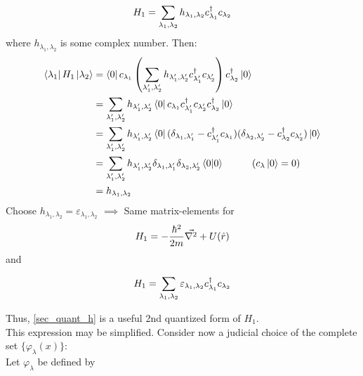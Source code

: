 \begin{equation}
	H_1 = \sum_{\lambda_1, \lambda_2} h_{\lambda_1, \lambda_2} c^{\dagger}_{\lambda_1} c_{\lambda_2}
\end{equation}
where $ h_{\lambda_1, \lambda_2}$ is some complex number.
Then:
\begin{align}
	\bra{\lambda_1} H_1 \ket{\lambda_2} &= \bra{0}c_{\lambda_1} \left(\sum_{\lambda'_1, \lambda'_2} h_{\lambda'_1, \lambda'_2} c^{\dagger}_{\lambda'_1} c_{\lambda'_2} \right) c^{\dagger}_{\lambda_2} \ket{0} \\
	&=\sum_{\lambda'_1, \lambda'_2} h_{\lambda'_1, \lambda'_2}  \bra{0}c_{\lambda_1}  c^{\dagger}_{\lambda'_1} c_{\lambda'_2} c^{\dagger}_{\lambda_2} \ket{0} \nonumber \\
	&= \sum_{\lambda'_1, \lambda'_2} h_{\lambda'_1, \lambda'_2}  \bra{0} (\delta_{\lambda_1, \lambda'_1}-c^{\dagger}_{\lambda'_1}c_{\lambda_1} ) (\delta_{\lambda_2, \lambda'_2} -c^{\dagger}_{\lambda_2} c_{\lambda'_2}) \ket{0} \nonumber\\
	&= \sum_{\lambda'_1, \lambda'_2} h_{\lambda'_1, \lambda'_2}  \delta_{\lambda_1, \lambda'_1} \delta_{\lambda_2, \lambda'_2} \braket{0}{0}\nonumber \hspace{1cm} (c_\lambda \ket{0} =0)  \\
	&= h_{\lambda_1, \lambda_2} \nonumber
\end{align}
Choose $ h_{\lambda_1, \lambda_2} = \varepsilon_{\lambda_1, \lambda_2}$ $\implies$ Same matrix-elements for
\begin{equation}
	H_1 = -\frac{\hbar^2}{2m} \vec{\laplacian}+ U(\hat{r}) 
\end{equation}
and
\begin{tcolorbox}
	\begin{equation}
		H_1 = \sum_{\lambda_1, \lambda_2} \varepsilon_{\lambda_1, \lambda_2} c^{\dagger}_{\lambda_1} c_{\lambda_2} \label{sec_quant_h}
	\end{equation}
\end{tcolorbox}
Thus, \ref{sec_quant_h} is a useful 2nd quantized form of $H_1$.\\
\linebreak
\noindent This expression may be simplified. Consider now a judicial choice of the complete set $\{\varphi_\lambda(x) \}$:\\
\noindent Let ${\varphi_\lambda}$ be defined by

